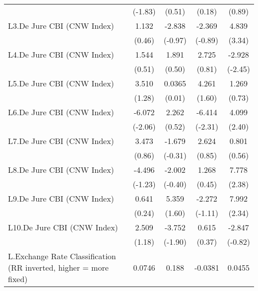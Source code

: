 {\begin{longtable}{l*{4}{c}}
                &  (-1.83)         &   (0.51)         &   (0.18)         &   (0.89)         \\
[1em]
L3.De Jure CBI (CNW Index)&    1.132         &   -2.838         &   -2.369         &    4.839\sym{***}\\
                &   (0.46)         &  (-0.97)         &  (-0.89)         &   (3.34)         \\
[1em]
L4.De Jure CBI (CNW Index)&    1.544         &    1.891         &    2.725         &   -2.928\sym{*}  \\
                &   (0.51)         &   (0.50)         &   (0.81)         &  (-2.45)         \\
[1em]
L5.De Jure CBI (CNW Index)&    3.510         &   0.0365         &    4.261         &    1.269         \\
                &   (1.28)         &   (0.01)         &   (1.60)         &   (0.73)         \\
[1em]
L6.De Jure CBI (CNW Index)&   -6.072\sym{*}  &    2.262         &   -6.414\sym{*}  &    4.099\sym{*}  \\
                &  (-2.06)         &   (0.52)         &  (-2.31)         &   (2.40)         \\
[1em]
L7.De Jure CBI (CNW Index)&    3.473         &   -1.679         &    2.624         &    0.801         \\
                &   (0.86)         &  (-0.31)         &   (0.85)         &   (0.56)         \\
[1em]
L8.De Jure CBI (CNW Index)&   -4.496         &   -2.002         &    1.268         &    7.778\sym{*}  \\
                &  (-1.23)         &  (-0.40)         &   (0.45)         &   (2.38)         \\
[1em]
L9.De Jure CBI (CNW Index)&    0.641         &    5.359         &   -2.272         &    7.992\sym{*}  \\
                &   (0.24)         &   (1.60)         &  (-1.11)         &   (2.34)         \\
[1em]
L10.De Jure CBI (CNW Index)&    2.509         &   -3.752         &    0.615         &   -2.847         \\
                &   (1.18)         &  (-1.90)         &   (0.37)         &  (-0.82)         \\
[1em]
L.Exchange Rate Classification (RR inverted, higher = more fixed)&   0.0746         &    0.188         &  -0.0381         &   0.0455         \\

\end{longtable}}
